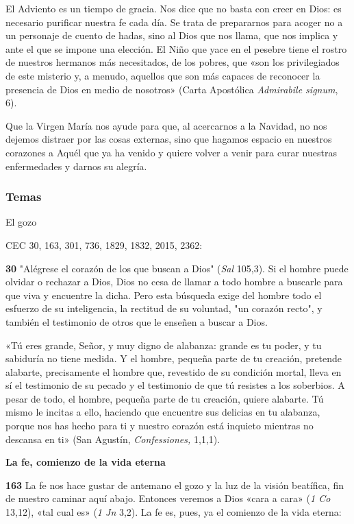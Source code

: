 \documentclass[]{article}
\begin{document}
El Adviento es un tiempo de gracia. Nos dice que no basta con creer en
Dios: es necesario purificar nuestra fe cada día. Se trata de
prepararnos para acoger no a un personaje de cuento de hadas, sino al
Dios que nos llama, que nos implica y ante el que se impone una
elección. El Niño que yace en el pesebre tiene el rostro de nuestros
hermanos más necesitados, de los pobres, que «son los privilegiados de
este misterio y, a menudo, aquellos que son más capaces de reconocer la
presencia de Dios en medio de nosotros» (Carta Apostólica
\emph{Admirabile signum}, 6).

Que la Virgen María nos ayude para que, al acercarnos a la Navidad, no
nos dejemos distraer por las cosas externas, sino que hagamos espacio en
nuestros corazones a Aquél que ya ha venido y quiere volver a venir para
curar nuestras enfermedades y darnos su alegría.

\protect\hypertarget{_Toc448662753}{}{\protect\hypertarget{_Toc448690272}{}{}}

\subsubsection{Temas}\label{temas-2}

El gozo

CEC 30, 163, 301, 736, 1829, 1832, 2015, 2362:

\textbf{30} "Alégrese el corazón de los que buscan a Dios" (\emph{Sal}
105,3). Si el hombre puede olvidar o rechazar a Dios, Dios no cesa de
llamar a todo hombre a buscarle para que viva y encuentre la dicha. Pero
esta búsqueda exige del hombre todo el esfuerzo de su inteligencia, la
rectitud de su voluntad, "un corazón recto", y también el testimonio de
otros que le enseñen a buscar a Dios.

«Tú eres grande, Señor, y muy digno de alabanza: grande es tu poder, y
tu sabiduría no tiene medida. Y el hombre, pequeña parte de tu creación,
pretende alabarte, precisamente el hombre que, revestido de su condición
mortal, lleva en sí el testimonio de su pecado y el testimonio de que tú
resistes a los soberbios. A pesar de todo, el hombre, pequeña parte de
tu creación, quiere alabarte. Tú mismo le incitas a ello, haciendo que
encuentre sus delicias en tu alabanza, porque nos has hecho para ti y
nuestro corazón está inquieto mientras no descansa en ti» (San Agustín,
\emph{Confessiones,} 1,1,1).

\textbf{La fe, comienzo de la vida eterna}

\textbf{163} La fe nos hace gustar de antemano el gozo y la luz de la
visión beatífica, fin de nuestro caminar aquí abajo. Entonces veremos a
Dios «cara a cara» (\emph{1 Co} 13,12), «tal cual es» (\emph{1 Jn} 3,2).
La fe es, pues, ya el comienzo de la vida eterna:
\end{document}
